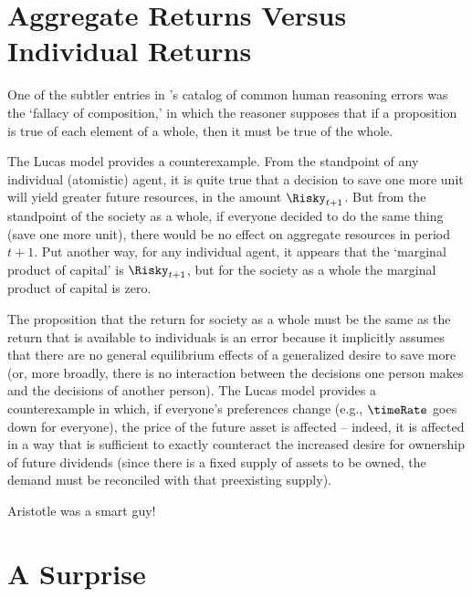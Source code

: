 \documentclass{\handout}
\begin{document}
\section{Aggregate Returns Versus Individual Returns}

One of the subtler entries in \cite{aristotleFallacies}'s catalog of common human reasoning errors was the `fallacy of composition,' in which the reasoner supposes that if a proposition is true of each element of a whole, then it must be true of the whole.

The Lucas model provides a counterexample.  From the standpoint of any individual (atomistic) agent, it is quite true that a decision to save one more unit will yield greater future resources, in the amount $\Risky_{t+1}$.  But from the standpoint of the society as a whole, if everyone decided to do the same thing (save one more unit), there would be no effect on aggregate resources in period $t+1$.  Put another way, for any individual agent, it appears that the `marginal product of capital' is $\Risky_{t+1}$, but for the society as a whole the marginal product of capital is zero.

The proposition that the return for society as a whole must be the same as the return that is available to individuals is an error because it implicitly assumes that there are no general equilibrium effects of a generalized desire to save more (or, more broadly, there is no interaction between the decisions one person makes and the decisions of another person).  The Lucas model provides a counterexample in which, if everyone's preferences change (e.g., $\timeRate$ goes down for everyone), the price of the future asset is affected -- indeed, it is affected in a way that is sufficient to exactly counteract the increased desire for ownership of future dividends (since there is a fixed supply of assets to be owned, the demand must be reconciled with that preexisting supply).

Aristotle was a smart guy!

\section{A Surprise}
\end{document}
